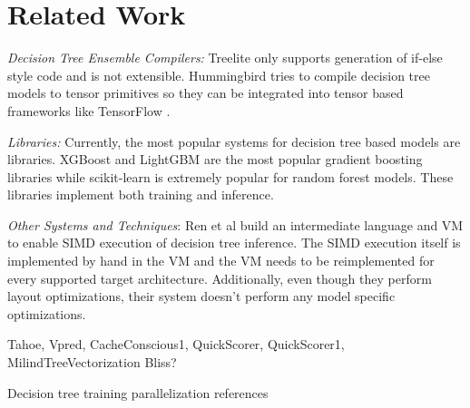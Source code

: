 \section{Related Work}

\emph{Decision Tree Ensemble Compilers:}
Treelite\cite{Treelite} only supports generation of if-else style code and is not extensible.
Hummingbird\cite{Hummingbird} tries to compile decision tree models to tensor primitives so 
they can be integrated into tensor based frameworks like TensorFlow \cite{TensorFlow}.

\emph{Libraries:} Currently, the most popular systems for decision tree based models 
are libraries. XGBoost\cite{XGBoost} and LightGBM\cite{LightGBM} are the most  
popular gradient boosting libraries while scikit-learn\cite{Sklearn} is 
extremely popular for random forest models. These libraries implement both 
training and inference. 

\emph{Other Systems and Techniques}: 
Ren et al \cite{PortableVM} build an intermediate language and VM to 
enable SIMD execution of decision tree inference. The SIMD execution itself is implemented 
by hand in the VM and the VM needs to be reimplemented for every supported target architecture.
Additionally, even though they perform layout optimizations, their system doesn't perform 
any model specific optimizations. 

Tahoe, Vpred, CacheConscious1, QuickScorer, QuickScorer1, MilindTreeVectorization
Bliss?

Decision tree training parallelization references
